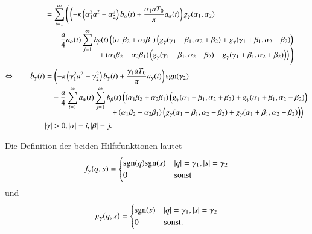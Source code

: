 \begin{refsection}
\begin{align}
&=
\sum_{i = 1}^{\infty}
\Bigg(
\left(
-
\kappa
\left(\alpha_1^2 a^2 + \alpha_2^2\right)
b_{\alpha}(t)
+
\frac{\alpha_1 a T_0}{\pi}
a_{\alpha}(t)
\right)
g_\gamma(\alpha_1, \alpha_2) 
\nonumber
\\
&\phantom{={}}
-
\frac{a}{4}
a_{\alpha}(t)
\sum_{j = 1}^{\infty}
b_{\beta}(t)
\left(
\left(\alpha_1 \beta_2 + \alpha_2 \beta_1 \right)
\left(
g_\gamma(\gamma_1 - \beta_1, \alpha_2 + \beta_2)
+
g_\gamma(\gamma_1 + \beta_1, \alpha_2 - \beta_2)
\right)
\right. \nonumber
\\[-3ex]
&\phantom{=-aat\sum\sum...{}}
\left.
+
\left(\alpha_1 \beta_2 - \alpha_2 \beta_1 \right)
\left(
g_\gamma(\gamma_1 - \beta_1, \alpha_2 - \beta_2)
+
g_\gamma(\gamma_1 + \beta_1, \alpha_2 + \beta_2)
\right)
\right)
\Bigg) \nonumber
\\
\Leftrightarrow \qquad
\dot{b}_\gamma(t)
&=
\left(
-
\kappa
\left(\gamma_1^2 a^2 + \gamma_2^2\right)
b_{\gamma}(t)
+
\frac{\gamma_1 a T_0}{\pi}
a_{\gamma}(t)
\right)
\sgn(\gamma_2) \nonumber
\\
&\phantom{={}}
-
\frac{a}{4}
\sum_{i = 1}^{\infty}
a_{\alpha}(t)
\sum_{j = 1}^{\infty}
b_{\beta}(t)
\left(
\left(\alpha_1 \beta_2 + \alpha_2 \beta_1 \right)
\left(
g_\gamma(\alpha_1 - \beta_1, \alpha_2 + \beta_2)
+
g_\gamma(\alpha_1 + \beta_1, \alpha_2 - \beta_2)
\right)
\right.\nonumber
\\[-2ex]
&\phantom{=-aat\sum..a..\sum...{}}
\left.
+
\left(\alpha_1 \beta_2 - \alpha_2 \beta_1 \right)
\left(
g_\gamma(\alpha_1 - \beta_1, \alpha_2 - \beta_2)
+
g_\gamma(\alpha_1 + \beta_1, \alpha_2 + \beta_2)
\right)
\right)
\label{equation:lorenz2:dotb}
\\
&|\gamma| > 0, |\alpha| = i, |\beta| = j.\nonumber
\end{align}

Die Definition der beiden Hilfsfunktionen lautet
\begin{equation*}
f_\gamma(q, s)
=
\begin{cases}
\sgn(q)\sgn(s) & |q| = \gamma_1, |s| = \gamma_2 \\
0 & \text{sonst}
\end{cases}
\end{equation*}
und
\begin{equation*}
g_\gamma(q, s)
=
\begin{cases}
\sgn(s) & |q| = \gamma_1, |s| = \gamma_2 \\
0 & \text{sonst}.
\end{cases}
\end{equation*}


\end{refsection}
